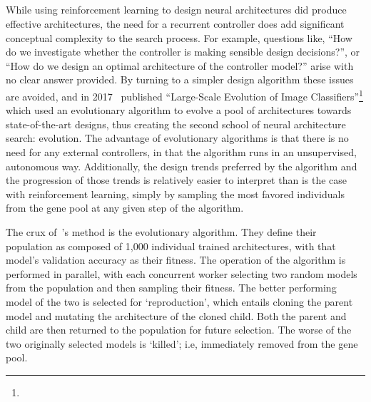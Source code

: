 \subsection{}
While using reinforcement learning to design neural architectures did produce effective architectures, the need for a
recurrent controller does add significant conceptual complexity to the search process. For example, questions like,
``How do we investigate whether the controller is making sensible design decisions?'', or ``How do we design an optimal
architecture of the controller model?'' arise with no clear answer provided. By turning to a simpler design algorithm
these issues are avoided, and in 2017~\citeauthor{real2017} published ``Large-Scale Evolution of Image Classifiers''\footnote{} which used an
evolutionary algorithm to evolve a pool of architectures towards state-of-the-art designs, thus creating the second school
of neural architecture search: evolution. The advantage of evolutionary algorithms is that there is no need for any external
controllers, in that the algorithm runs in an unsupervised, autonomous way. Additionally, the design trends preferred
by the algorithm and the progression of those trends is relatively easier to interpret than is the case with reinforcement learning,
simply by sampling the most favored individuals from the gene pool at any given step of the algorithm.

The crux of~\citeauthor{real2017}'s method is the evolutionary algorithm. They define their population as composed of 1,000 individual
trained architectures, with that model's validation accuracy as their fitness. The operation of the algorithm is performed
in parallel, with each concurrent worker selecting two random models from the population and then sampling their fitness.
The better performing model of the two is selected for `reproduction', which entails cloning the parent model and mutating
the architecture of the cloned child. Both the parent and child are then returned to the population for future selection.
The worse of the two originally selected models is `killed'; i.e, immediately removed from the gene pool.

